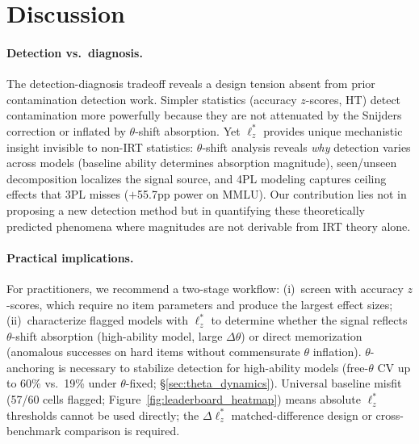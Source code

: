 \section{Discussion}\label{sec:discussion}

\paragraph{Detection vs.\ diagnosis.}
The detection-diagnosis tradeoff reveals a design tension absent from prior contamination detection work.
Simpler statistics (accuracy $z$-scores, HT) detect contamination more powerfully because they are not attenuated by the Snijders correction or inflated by $\theta$-shift absorption.
Yet $\ell_z^*$ provides unique mechanistic insight invisible to non-IRT statistics: $\theta$-shift analysis reveals \emph{why} detection varies across models (baseline ability determines absorption magnitude), seen/unseen decomposition localizes the signal source, and 4PL modeling captures ceiling effects that 3PL misses ($+$55.7pp power on MMLU).
Our contribution lies not in proposing a new detection method but in quantifying these theoretically predicted phenomena where magnitudes are not derivable from IRT theory alone.

\paragraph{Practical implications.}
For practitioners, we recommend a two-stage workflow: (i)~screen with accuracy $z$-scores, which require no item parameters and produce the largest effect sizes; (ii)~characterize flagged models with $\ell_z^*$ to determine whether the signal reflects $\theta$-shift absorption (high-ability model, large $\Delta\theta$) or direct memorization (anomalous successes on hard items without commensurate $\theta$ inflation).
$\theta$-anchoring is necessary to stabilize detection for high-ability models (free-$\theta$ CV up to 60\% vs.\ 19\% under $\theta$-fixed; \S\ref{sec:theta_dynamics}).
Universal baseline misfit (57/60 cells flagged; Figure~\ref{fig:leaderboard_heatmap}) means absolute $\ell_z^*$ thresholds cannot be used directly; the $\Delta\ell_z^*$ matched-difference design or cross-benchmark comparison is required.

